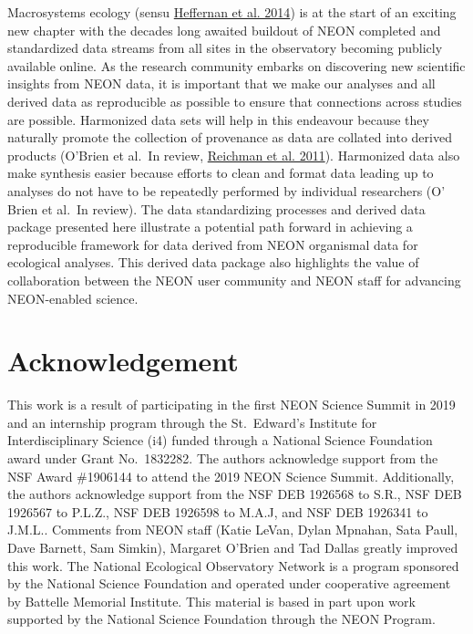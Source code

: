 \documentclass[
  12pt,
]{article}
\begin{document}
Macrosystems ecology (sensu \protect\hyperlink{ref-heffernan2014macrosystems}{Heffernan et al. 2014}) is at the start of an exciting new chapter with the decades long awaited buildout of NEON completed and standardized data streams from all sites in the observatory becoming publicly available online. As the research community embarks on discovering new scientific insights from NEON data, it is important that we make our analyses and all derived data as reproducible as possible to ensure that connections across studies are possible. Harmonized data sets will help in this endeavour because they naturally promote the collection of provenance as data are collated into derived products (O'Brien et al.~In review, \protect\hyperlink{ref-reichman2011challenges}{Reichman et al. 2011}). Harmonized data also make synthesis easier because efforts to clean and format data leading up to analyses do not have to be repeatedly performed by individual researchers (O' Brien et al.~In review). The data standardizing processes and derived data package presented here illustrate a potential path forward in achieving a reproducible framework for data derived from NEON organismal data for ecological analyses. This derived data package also highlights the value of collaboration between the NEON user community and NEON staff for advancing NEON-enabled science.

\hypertarget{acknowledgement}{%
\section{Acknowledgement}\label{acknowledgement}}

This work is a result of participating in the first NEON Science Summit in 2019 and an internship program through the St.~Edward's Institute for Interdisciplinary Science (i4) funded through a National Science Foundation award under Grant No.~1832282. The authors acknowledge support from the NSF Award \#1906144 to attend the 2019 NEON Science Summit. Additionally, the authors acknowledge support from the NSF DEB 1926568 to S.R., NSF DEB 1926567 to P.L.Z., NSF DEB 1926598 to M.A.J, and NSF DEB 1926341 to J.M.L.. Comments from NEON staff (Katie LeVan, Dylan Mpnahan, Sata Paull, Dave Barnett, Sam Simkin), Margaret O'Brien and Tad Dallas greatly improved this work. The National Ecological Observatory Network is a program sponsored by the National Science Foundation and operated under cooperative agreement by Battelle Memorial Institute. This material is based in part upon work supported by the National Science Foundation through the NEON Program.
\end{document}
